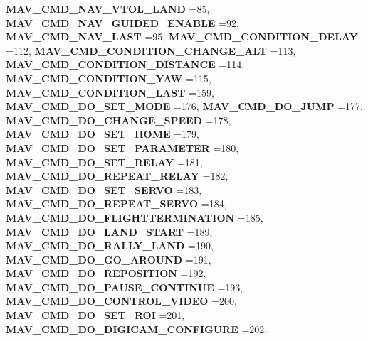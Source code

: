 \begin{DoxyCompactItemize}
\textbf{ M\+A\+V\+\_\+\+C\+M\+D\+\_\+\+N\+A\+V\+\_\+\+V\+T\+O\+L\+\_\+\+L\+A\+ND} =85, 
\textbf{ M\+A\+V\+\_\+\+C\+M\+D\+\_\+\+N\+A\+V\+\_\+\+G\+U\+I\+D\+E\+D\+\_\+\+E\+N\+A\+B\+LE} =92, 
\textbf{ M\+A\+V\+\_\+\+C\+M\+D\+\_\+\+N\+A\+V\+\_\+\+L\+A\+ST} =95, 
\newline
\textbf{ M\+A\+V\+\_\+\+C\+M\+D\+\_\+\+C\+O\+N\+D\+I\+T\+I\+O\+N\+\_\+\+D\+E\+L\+AY} =112, 
\textbf{ M\+A\+V\+\_\+\+C\+M\+D\+\_\+\+C\+O\+N\+D\+I\+T\+I\+O\+N\+\_\+\+C\+H\+A\+N\+G\+E\+\_\+\+A\+LT} =113, 
\textbf{ M\+A\+V\+\_\+\+C\+M\+D\+\_\+\+C\+O\+N\+D\+I\+T\+I\+O\+N\+\_\+\+D\+I\+S\+T\+A\+N\+CE} =114, 
\textbf{ M\+A\+V\+\_\+\+C\+M\+D\+\_\+\+C\+O\+N\+D\+I\+T\+I\+O\+N\+\_\+\+Y\+AW} =115, 
\newline
\textbf{ M\+A\+V\+\_\+\+C\+M\+D\+\_\+\+C\+O\+N\+D\+I\+T\+I\+O\+N\+\_\+\+L\+A\+ST} =159, 
\textbf{ M\+A\+V\+\_\+\+C\+M\+D\+\_\+\+D\+O\+\_\+\+S\+E\+T\+\_\+\+M\+O\+DE} =176, 
\textbf{ M\+A\+V\+\_\+\+C\+M\+D\+\_\+\+D\+O\+\_\+\+J\+U\+MP} =177, 
\textbf{ M\+A\+V\+\_\+\+C\+M\+D\+\_\+\+D\+O\+\_\+\+C\+H\+A\+N\+G\+E\+\_\+\+S\+P\+E\+ED} =178, 
\newline
\textbf{ M\+A\+V\+\_\+\+C\+M\+D\+\_\+\+D\+O\+\_\+\+S\+E\+T\+\_\+\+H\+O\+ME} =179, 
\textbf{ M\+A\+V\+\_\+\+C\+M\+D\+\_\+\+D\+O\+\_\+\+S\+E\+T\+\_\+\+P\+A\+R\+A\+M\+E\+T\+ER} =180, 
\textbf{ M\+A\+V\+\_\+\+C\+M\+D\+\_\+\+D\+O\+\_\+\+S\+E\+T\+\_\+\+R\+E\+L\+AY} =181, 
\textbf{ M\+A\+V\+\_\+\+C\+M\+D\+\_\+\+D\+O\+\_\+\+R\+E\+P\+E\+A\+T\+\_\+\+R\+E\+L\+AY} =182, 
\newline
\textbf{ M\+A\+V\+\_\+\+C\+M\+D\+\_\+\+D\+O\+\_\+\+S\+E\+T\+\_\+\+S\+E\+R\+VO} =183, 
\textbf{ M\+A\+V\+\_\+\+C\+M\+D\+\_\+\+D\+O\+\_\+\+R\+E\+P\+E\+A\+T\+\_\+\+S\+E\+R\+VO} =184, 
\textbf{ M\+A\+V\+\_\+\+C\+M\+D\+\_\+\+D\+O\+\_\+\+F\+L\+I\+G\+H\+T\+T\+E\+R\+M\+I\+N\+A\+T\+I\+ON} =185, 
\textbf{ M\+A\+V\+\_\+\+C\+M\+D\+\_\+\+D\+O\+\_\+\+L\+A\+N\+D\+\_\+\+S\+T\+A\+RT} =189, 
\newline
\textbf{ M\+A\+V\+\_\+\+C\+M\+D\+\_\+\+D\+O\+\_\+\+R\+A\+L\+L\+Y\+\_\+\+L\+A\+ND} =190, 
\textbf{ M\+A\+V\+\_\+\+C\+M\+D\+\_\+\+D\+O\+\_\+\+G\+O\+\_\+\+A\+R\+O\+U\+ND} =191, 
\textbf{ M\+A\+V\+\_\+\+C\+M\+D\+\_\+\+D\+O\+\_\+\+R\+E\+P\+O\+S\+I\+T\+I\+ON} =192, 
\textbf{ M\+A\+V\+\_\+\+C\+M\+D\+\_\+\+D\+O\+\_\+\+P\+A\+U\+S\+E\+\_\+\+C\+O\+N\+T\+I\+N\+UE} =193, 
\newline
\textbf{ M\+A\+V\+\_\+\+C\+M\+D\+\_\+\+D\+O\+\_\+\+C\+O\+N\+T\+R\+O\+L\+\_\+\+V\+I\+D\+EO} =200, 
\textbf{ M\+A\+V\+\_\+\+C\+M\+D\+\_\+\+D\+O\+\_\+\+S\+E\+T\+\_\+\+R\+OI} =201, 
\textbf{ M\+A\+V\+\_\+\+C\+M\+D\+\_\+\+D\+O\+\_\+\+D\+I\+G\+I\+C\+A\+M\+\_\+\+C\+O\+N\+F\+I\+G\+U\+RE} =202, 

\end{DoxyCompactItemize}

